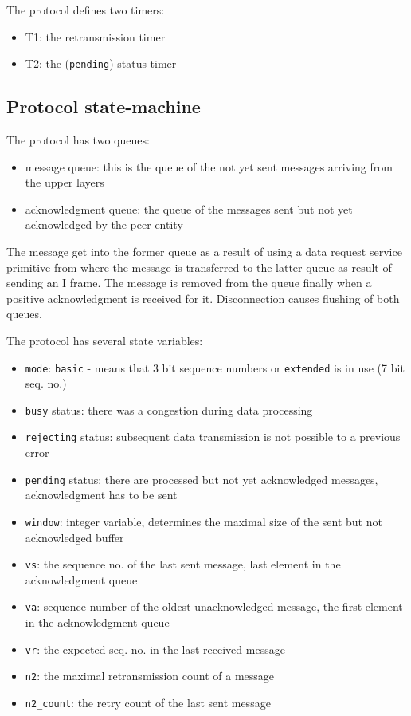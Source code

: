 \documentclass[a4paper]{article}
\begin{document}
The protocol defines two timers:
\begin{itemize}
    \item T1: the retransmission timer
    \item T2: the (\verb!pending!) status timer
\end{itemize}

\subsection{Protocol state-machine}

The protocol has two queues:
\begin{itemize}
    \item message queue: this is the queue of the not yet sent messages arriving from the upper layers
    \item acknowledgment queue: the queue of the messages sent but not yet acknowledged by the peer entity
\end{itemize}

The message get into the former queue as a result of using a data request service primitive from where the message is
transferred to the latter queue as result of sending an I frame. The message is removed from the queue finally when a
positive acknowledgment is received for it. Disconnection causes flushing of both queues.

The protocol has several state variables:
\begin{itemize}
    \item \verb!mode!: \verb!basic! - means that 3 bit sequence numbers or
          \verb!extended! is in use (7 bit seq. no.)
    \item \verb!busy! status: there was a congestion during data processing
    \item \verb!rejecting! status: subsequent data transmission is not possible to a previous error
    \item \verb!pending! status: there are processed but not yet acknowledged messages, acknowledgment
          has to
          be sent
    \item \verb!window!: integer variable, determines the maximal size of the sent but not acknowledged
          buffer
    \item \verb!vs!: the sequence no. of the last sent message, last element in the acknowledgment
          queue
    \item \verb!va!: sequence number of the oldest unacknowledged message, the first element in the
          acknowledgment queue
    \item \verb!vr!: the expected seq. no. in the last received message
    \item \verb!n2!: the maximal retransmission count of a message
    \item \verb!n2_count!: the retry count of the last sent message
\end{itemize}
\end{document}
